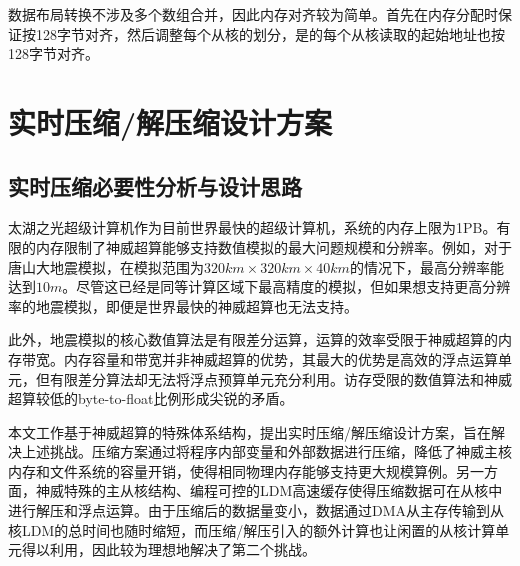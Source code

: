 数据布局转换不涉及多个数组合并，因此内存对齐较为简单。首先在内存分配时保证按128字节对齐，然后调整每个从核的划分，是的每个从核读取的起始地址也按128字节对齐。




\section{实时压缩/解压缩设计方案}
\label{sec:实时压缩/解压缩设计方案}
\subsection{实时压缩必要性分析与设计思路}

太湖之光超级计算机作为目前世界最快的超级计算机，系统的内存上限为1PB。有限的内存限制了神威超算能够支持数值模拟的最大问题规模和分辨率。例如，对于唐山大地震模拟，在模拟范围为$320km\times 320km \times 40km$的情况下，最高分辨率能达到$10m$。尽管这已经是同等计算区域下最高精度的模拟，但如果想支持更高分辨率的地震模拟，即便是世界最快的神威超算也无法支持。

此外，地震模拟的核心数值算法是有限差分运算，运算的效率受限于神威超算的内存带宽。内存容量和带宽并非神威超算的优势，其最大的优势是高效的浮点运算单元，但有限差分算法却无法将浮点预算单元充分利用。访存受限的数值算法和神威超算较低的byte-to-float比例形成尖锐的矛盾。

本文工作基于神威超算的特殊体系结构，提出实时压缩/解压缩设计方案，旨在解决上述挑战。压缩方案通过将程序内部变量和外部数据进行压缩，降低了神威主核内存和文件系统的容量开销，使得相同物理内存能够支持更大规模算例。另一方面，神威特殊的主从核结构、编程可控的LDM高速缓存使得压缩数据可在从核中进行解压和浮点运算。由于压缩后的数据量变小，数据通过DMA从主存传输到从核LDM的总时间也随时缩短，而压缩/解压引入的额外计算也让闲置的从核计算单元得以利用，因此较为理想地解决了第二个挑战。

